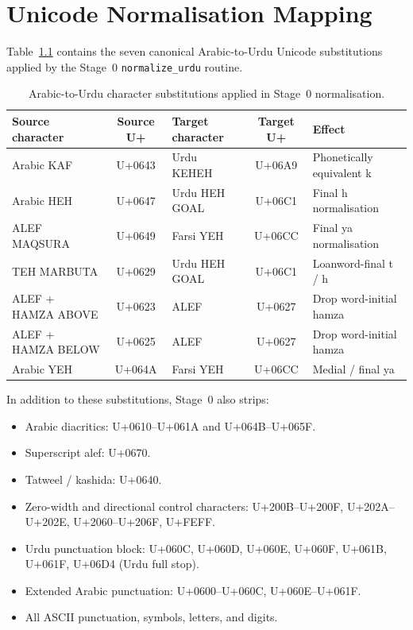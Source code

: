 \chapter{Unicode Normalisation Mapping}
\label{app:unicode-table}

Table~\ref{tab:unicode-mapping} contains the seven canonical Arabic-to-Urdu Unicode substitutions applied by the Stage~0 \texttt{normalize\_urdu} routine.

\begin{table}[h]
    \centering
    \renewcommand{\arraystretch}{1.30}
    \small
    \begin{tabular}{p{3.2cm}cp{3.0cm}cp{3.2cm}}
    \toprule
    \textbf{Source character} & \textbf{Source U+} & \textbf{Target character} & \textbf{Target U+} & \textbf{Effect} \\
    \midrule
    Arabic KAF                & U+0643 & Urdu KEHEH    & U+06A9 & Phonetically equivalent k \\
    Arabic HEH                & U+0647 & Urdu HEH GOAL & U+06C1 & Final h normalisation \\
    ALEF MAQSURA              & U+0649 & Farsi YEH     & U+06CC & Final ya normalisation \\
    TEH MARBUTA               & U+0629 & Urdu HEH GOAL & U+06C1 & Loanword-final t / h \\
    ALEF + HAMZA ABOVE        & U+0623 & ALEF          & U+0627 & Drop word-initial hamza \\
    ALEF + HAMZA BELOW        & U+0625 & ALEF          & U+0627 & Drop word-initial hamza \\
    Arabic YEH                & U+064A & Farsi YEH     & U+06CC & Medial / final ya \\
    \bottomrule
    \end{tabular}
    \caption{Arabic-to-Urdu character substitutions applied in Stage~0 normalisation.}
    \label{tab:unicode-mapping}
\end{table}

In addition to these substitutions, Stage~0 also strips:
\begin{itemize}
    \item Arabic diacritics: U+0610--U+061A and U+064B--U+065F.
    \item Superscript alef: U+0670.
    \item Tatweel / kashida: U+0640.
    \item Zero-width and directional control characters: U+200B--U+200F, U+202A--U+202E, U+2060--U+206F, U+FEFF.
    \item Urdu punctuation block: U+060C, U+060D, U+060E, U+060F, U+061B, U+061F, U+06D4 (Urdu full stop).
    \item Extended Arabic punctuation: U+0600--U+060C, U+060E--U+061F.
    \item All ASCII punctuation, symbols, letters, and digits.
\end{itemize}

